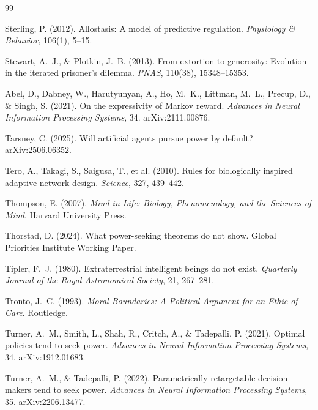 \documentclass[11pt,a4paper,twocolumn]{article}
\begin{document}
\begin{thebibliography}{99}

 Sterling, P. (2012). Allostasis: A model of predictive regulation. \textit{Physiology \& Behavior}, 106(1), 5--15.

 Stewart, A.~J., \& Plotkin, J.~B. (2013). From extortion to generosity: Evolution in the iterated prisoner's dilemma. \textit{PNAS}, 110(38), 15348--15353.

 Abel, D., Dabney, W., Harutyunyan, A., Ho, M.~K., Littman, M.~L., Precup, D., \& Singh, S. (2021). On the expressivity of Markov reward. \textit{Advances in Neural Information Processing Systems}, 34. arXiv:2111.00876.

 Tarsney, C. (2025). Will artificial agents pursue power by default? arXiv:2506.06352.

 Tero, A., Takagi, S., Saigusa, T., et al. (2010). Rules for biologically inspired adaptive network design. \textit{Science}, 327, 439--442.

 Thompson, E. (2007). \textit{Mind in Life: Biology, Phenomenology, and the Sciences of Mind}. Harvard University Press.

 Thorstad, D. (2024). What power-seeking theorems do not show. Global Priorities Institute Working Paper.

 Tipler, F.~J. (1980). Extraterrestrial intelligent beings do not exist. \textit{Quarterly Journal of the Royal Astronomical Society}, 21, 267--281.

 Tronto, J.~C. (1993). \textit{Moral Boundaries: A Political Argument for an Ethic of Care}. Routledge.

 Turner, A.~M., Smith, L., Shah, R., Critch, A., \& Tadepalli, P. (2021). Optimal policies tend to seek power. \textit{Advances in Neural Information Processing Systems}, 34. arXiv:1912.01683.

 Turner, A.~M., \& Tadepalli, P. (2022). Parametrically retargetable decision-makers tend to seek power. \textit{Advances in Neural Information Processing Systems}, 35. arXiv:2206.13477.


\end{thebibliography}
\end{document}

